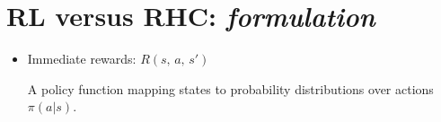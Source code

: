 \section{RL versus RHC: \textnormal{\textit{formulation}}}
\begin{itemize}
	
	\item Immediate rewards: $R(s,\,a,\,s')$
	
	A policy function mapping states to probability distributions over actions $\pi(a \vert s)$.
	
\end{itemize}